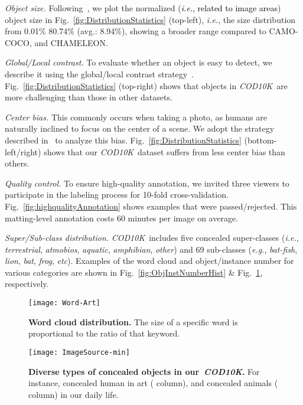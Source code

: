 \documentclass[10pt,journal,compsoc]{IEEEtran}
\def\ie{\emph{i.e.}}
\def\eg{\emph{e.g.}}
\def\etc{\emph{etc}}
\newcommand{\figref}[1]{Fig.~\ref{#1}}
\newcommand{\Rev}[1]{\textcolor{black}{#1}}
\def\ourdataset{\textit{COD10K}}
\begin{document}
 \emph{Object size.}
Following~\cite{Fan2021SOC}, we plot the normalized (\Rev{\ie, related to image areas}) object size in
\figref{fig:DistributionStatistics} (top-left), \ie, the size distribution from
0.01\% 80.74\% (avg.: 8.94\%), showing a broader range compared to
CAMO-COCO, and CHAMELEON.

 \emph{Global/Local contrast.}
To evaluate whether an object is easy to detect,
we describe it using the global/local contrast strategy~\cite{li2014secrets}.
\figref{fig:DistributionStatistics} (top-right) shows that objects
in \ourdataset~are more challenging than those in other datasets.

 \emph{Center bias.}
This commonly occurs when taking a photo, as
humans are naturally inclined to focus on the center of a scene.
We adopt the strategy described in~\cite{Fan2021SOC} to analyze this bias.
\figref{fig:DistributionStatistics} (bottom-left/right) shows that our 
\ourdataset~dataset suffers from less center bias than others.


 \emph{Quality control.}
To ensure high-quality annotation, we invited three viewers to participate in
the labeling process for 10-fold cross-validation.
\figref{fig:highqualityAnnotation} shows examples that were passed/rejected.
This matting-level annotation costs  60 minutes per image on average.

 \emph{Super/Sub-class distribution.}
\ourdataset~includes five concealed super-classes (\ie, \emph{terrestrial}, 
\emph{atmobios}, \emph{aquatic}, \emph{amphibian}, \emph{other}) and
69 sub-classes (\eg, \emph{bat-fish}, \emph{lion}, \emph{bat}, \emph{frog}, 
\etc). 
Examples of the word cloud and object/instance number for various categories are
shown in \figref{fig:ObjInstNumberHist} \& \figref{fig:Wordcloud}, respectively.

\begin{figure}[t!]
  \centering
  \texttt{[image: Word-Art]}\\
  \vspace{-15pt}
  \caption{\textbf{Word cloud distribution.}
	The size of a specific word is proportional to the ratio 
	of that keyword.
  }\label{fig:Wordcloud}
\end{figure}

\begin{figure}[t!]
  \centering
  \texttt{[image: ImageSource-min]}\\
  \vspace{-10pt}
  \caption{\textbf{Diverse types of concealed objects in our~\ourdataset.} 
	For instance, concealed human in art ( column), and 
    concealed animals ( column) in our daily life.
  }\label{fig:DiverseType}
\end{figure}
\end{document}
